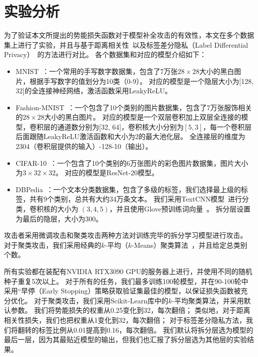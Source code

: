 \section{实验分析}
为了验证本文所提出的势能损失函数对于模型补全攻击的有效性，本文在多个数据集上进行了实验，并且与基于距离相关性~\cite{vepakomma2020nopeek,sunjiankai2022forward_embedding_protect}以及标签差分隐私（Label Differential Privacy）~\cite{wuruihan_2023_label_dp}的方法进行对比。
%
各个数据集和对应的模型介绍如下：
\begin{itemize}
    \item MNIST~\cite{mnist}：一个常用的手写数字数据集，包含了7万张$28\times 28$大小的黑白图片，根据手写数字的值划分为10类（0-9）。
    对应的模型是一个隐层大小为[128, 32]的全连接神经网络，激活函数采用LeakyReLU。
    
    \item Fashion-MNIST~\cite{fashion}：一个包含了10个类别的图片数据集，包含了7万张服饰相关的$28\times 28$大小的黑白图片。
    对应的模型是一个双层卷积加上双层全连接的模型，卷积层的通道数分别为[32, 64]，卷积核大小分别为$[5, 3]$，每一个卷积层后面跟随LeakyReLU激活函数和大小为2的最大池化层。
    全连接层的维度为2304（卷积层提供的输入）-128-10（输出）。
    
    \item CIFAR-10~\cite{cifar}：一个包含了10个类别的6万张图片的彩色图片数据集，图片大小为$3\times 32\times 32$。
    对应的模型是ResNet-20模型。

    \item DBPedia~\cite{2007dbpedia}：一个文本分类数据集，包含了多级的标签，我们选择最上级的标签，共有9个类别，总共有大约34万条文本。
    我们采用TextCNN模型~\cite{kimyoon2014textcnn}进行分类，卷积核的大小为 $(3,4,5)$，并且使用Glove预训练词向量~\cite{pennington2014glove}。
    拆分层设置为最后的隐层，大小为300。
\end{itemize}
%

攻击者采用微调攻击和聚类攻击两种方法对训练完毕的拆分学习模型进行攻击。
对于聚类攻击，我们采用经典的$k$-平均（$k$-Means）聚类算法~\cite{}，并且给定总类别个数。

所有实验都在装配有NVIDIA RTX3090 GPU的服务器上进行，并使用不同的随机种子重复5次以上。
%
对于所有的任务，我们最多训练100轮模型，并在90-100轮中采用“早停（Early Stopping）策略获取验证集最佳的模型，以保证损失函数被充分优化。
%
对于聚类攻击，我们采用Scikit-Learn库中的$k$-平均聚类算法，并采用默认参数。
%
我们将势能损失的权重从0.25变化到32，每次翻倍；
类似地，对于距离相关性损失，我们也把权重从1变化到32，每次翻倍；
对于标签差分隐私方法，我们将翻转的标签比例从0.01提高到0.16，每次翻倍。
%
我们默认将拆分层选为模型的最后一层，因为其最贴近模型的输出，但我们也汇报了拆分层选为其他层的实验结果。
%



